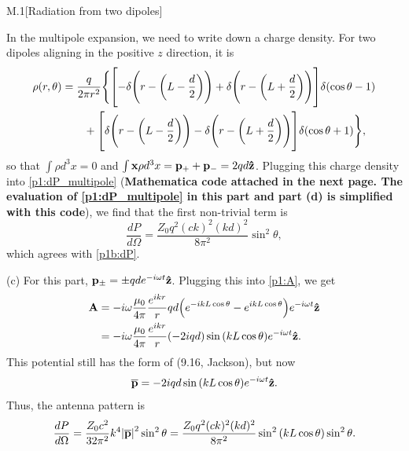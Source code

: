 \documentclass[12pt]{article}
\begin{document}
\begin{problem}{M.1}[Radiation from two dipoles]
\begin{solution}
In the multipole expansion, we need to write down a charge density. For two
dipoles aligning in the positive $z$ direction, it is
\begin{align}
    \rho(r,\theta)
    &=\frac{q}{2\pi
    r^2}\Bigg\{\qty[-\delta\qty(r-\qty(L-\frac{d}{2}))+\delta\qty(r-\qty(L+\frac{d}{2}))]\delta\qty(\cos\theta-1)\notag\\
    &\qquad+\qty[\delta\qty(r-\qty(L-\frac{d}{2}))-\delta\qty(r-\qty(L+\frac{d}{2}))]\delta\qty(\cos\theta+1)\Bigg\},
\end{align}
so that $\int\rho d^3x=0$ and $\int\vb{x}\rho d^3x=\vb{p}_++\vb{p}_-=2qd\vb{\hat{z}}$.
Plugging this charge density into \cref{p1:dP_multipole} (\textbf{Mathematica 
code attached in the next page. The evaluation of
\cref{p1:dP_multipole} in this part and part (d) is simplified with this 
code}), we find that the first non-trivial term is
\begin{equation}
    \frac{dP}{d\Omega}=\frac{Z_0q^2(ck)^2(kd)^2}{8\pi^2}\sin^2\theta,
\end{equation}
which agrees with \cref{p1b:dP}.

(c) For this part, $\vb{p}_\pm=\pm qde^{-i\omega t}\vb{\hat{z}}$. Plugging this into
\cref{p1:A}, we get
\begin{align}
    \vb{A}
    &=-i\omega\frac{\mu_0}{4\pi}\frac{e^{ikr}}{r}
    qd\qty(e^{-ikL\cos\theta}-e^{ikL\cos\theta})e^{-i\omega t}\vb{\hat{z}}\notag\\
    &=-i\omega\frac{\mu_0}{4\pi}\frac{e^{ikr}}{r}
        (-2iqd)\sin\qty(kL\cos\theta)e^{-i\omega t}\vb{\hat{z}}.
\end{align}
This potential still has the form of (9.16, Jackson), but now
\begin{equation}
    \vb{\overline{p}}=-2iqd\sin\qty(kL\cos\theta)e^{-i\omega t}\vb{\hat{z}} .
\end{equation}
Thus, the antenna pattern is
\begin{equation}
    \frac{dP}{d\Omega}
    =\frac{Z_0c^2}{32\pi^2}k^4\abs{\vb{\overline{p}}}^2\sin^2\theta 
    =\frac{Z_0q^2(ck)^2(kd)^2}{8\pi^2}\sin^2\qty(kL\cos\theta)\sin^2\theta.
\end{equation}


\end{solution}
\end{problem}
\end{document}
